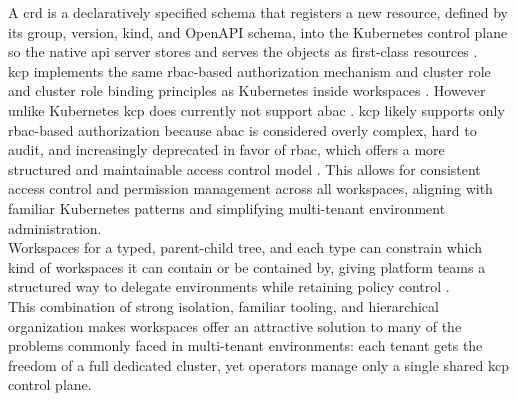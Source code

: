 \documentclass[11pt, a4paper, oneside, listof=totoc]{scrartcl}
\begin{document}
                A \gls{crd} is a declaratively specified schema that registers a new  resource,
                defined by its group, version, kind, and OpenAPI schema, into the Kubernetes control
                plane so the native \gls{api} server stores and serves the objects as first-class
                resources \parencite{kubernetesCRD}.
                \\
                \gls{kcp} implements the same \gls{rbac}-based authorization mechanism and cluster
                role and cluster role binding principles as Kubernetes inside workspaces 
                \parencite{kcpAuthorization}.
                However unlike Kubernetes \gls{kcp} does currently not support \gls{abac}
                \parencites{kcpAuthorization}{kubernetesABAC}.
                \gls{kcp} likely supports only \gls{rbac}-based authorization because \gls{abac} is
                considered overly complex, hard to audit, and increasingly deprecated in favor of
                \gls{rbac}, which offers a more structured and maintainable access control model
                \parencite{kubernetesRBACBlog}.
                This allows for consistent access control and permission management across all
                workspaces, aligning with familiar Kubernetes patterns and simplifying multi-tenant
                environment administration.
                \\
                Workspaces for a typed, parent-child tree, and each type can constrain which kind
                of workspaces it can contain or be contained by, giving platform teams a structured
                way to delegate environments while retaining policy control
                \parencite{kcpWorkspaces}.
                \\
                This combination of strong isolation, familiar tooling, and hierarchical
                organization makes workspaces offer an attractive solution to many of the problems
                commonly faced in multi-tenant environments: each tenant gets the freedom of a full
                dedicated cluster, yet operators manage only a single shared \gls{kcp} control
                plane.
            
\end{document}
